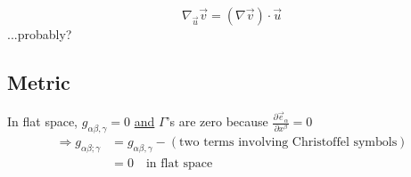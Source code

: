 \documentclass[a4paper]{article} %
\begin{document}
\begin{equation}
\nabla_{\vec{u}}\vec{v}=(\nabla\vec{v})\cdot \vec{u}
\end{equation}
...probably?


\subsection{Metric}
In flat space, $g_{\alpha\beta , \gamma}=0$ \underline{and} $\Gamma$'s are zero because $\frac{\partial\vec{e}_{\alpha}}{\partial x^{\beta}}=0$
\begin{align}
\Rightarrow g_{\alpha\beta;\gamma}&=g_{\alpha\beta,\gamma}-(\text{two terms involving Christoffel symbols})\\
&=0 \quad\text{in flat space}
\end{align}

\end{document}
